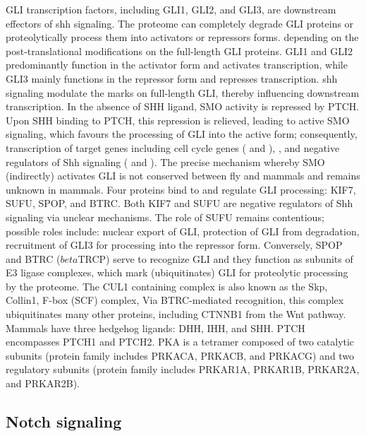 		GLI transcription factors, including GLI1, GLI2, and GLI3, are downstream effectors of \gls{shh} signaling. The proteome can completely degrade GLI proteins or proteolytically process them into activators or repressors forms. depending on the post-translational modifications on the full-length GLI proteins. GLI1 and GLI2 predominantly function in the activator form and activates transcription, while GLI3 mainly functions in the repressor form and represses transcription. \gls{shh} signaling modulate the marks on full-length GLI, thereby influencing downstream transcription.
		In the absence of SHH ligand, SMO activity is repressed by PTCH. Upon SHH binding to PTCH, this repression is relieved, leading to active SMO signaling, which favours the processing of GLI into the active form; consequently, transcription of target genes including cell cycle genes ( and ), , and negative regulators of Shh signaling ( and ).
		The precise mechanism whereby SMO (indirectly) activates GLI is not conserved between fly and mammals and remains unknown in mammals. Four proteins bind to and regulate GLI processing: KIF7, SUFU, SPOP, and BTRC. Both KIF7 and SUFU are negative regulators of Shh signaling via unclear mechanisms. The role of SUFU remains contentious; possible roles include: nuclear export of GLI, protection of GLI from degradation, recruitment of GLI3 for processing into the repressor form. Conversely, SPOP and BTRC ($beta$TRCP) serve to recognize GLI and they function as subunits of E3 ligase complexes, which mark (ubiquitinates) GLI for proteolytic processing by the proteome. The CUL1 containing complex is also known as the Skp, Collin1, F-box (SCF) complex, Via BTRC-mediated recognition, this complex ubiquitinates many other proteins, including CTNNB1 from the Wnt pathway.
		Mammals have three hedgehog ligands: DHH, IHH, and SHH. PTCH encompasses PTCH1 and PTCH2. PKA is a tetramer composed of two catalytic subunits (protein family includes PRKACA, PRKACB, and PRKACG) and two regulatory subunits (protein family includes PRKAR1A, PRKAR1B, PRKAR2A, and PRKAR2B).


\subsection{Notch signaling}

